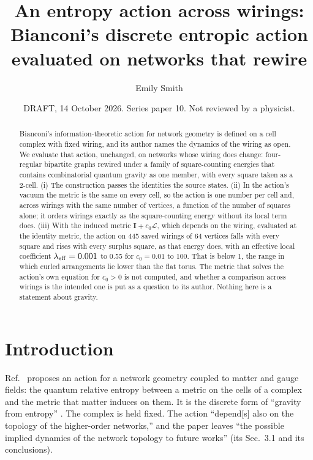\documentclass[pre,twocolumn,superscriptaddress,nofootinbib]{revtex4-2}
\begin{document}
\title{An entropy action across wirings: Bianconi's discrete entropic action evaluated on networks that rewire}

\author{Emily Smith}

\date{DRAFT, 14 October 2026. Series paper 10. Not reviewed by a physicist.}

\begin{abstract}
Bianconi's information-theoretic action for network geometry is defined on a cell complex with fixed wiring, and
its author names the dynamics of the wiring as open. We evaluate that action, unchanged, on networks whose wiring
does change: four-regular bipartite graphs rewired under a family of square-counting energies that contains
combinatorial quantum gravity as one member, with every square taken as a 2-cell. (i) The construction passes the
identities the source states. (ii) In the action's vacuum the metric is the same on every cell, so the action is one
number per cell and, across wirings with the same number of vertices, a function of the number of squares alone; it
orders wirings exactly as the square-counting energy without its local term does. (iii) With the induced metric
$\mathbf{I}+c_0\boldsymbol{\mathcal{L}}$, which depends on the wiring, evaluated at the identity metric, the action
on 445 saved wirings of 64 vertices falls with every square and rises with every surplus square, as that energy
does, with an effective local coefficient $\lambda_{\rm eff}=0.001$ to 0.55 for $c_0=0.01$ to 100. That is below 1,
the range in which curled arrangements lie lower than the flat torus. The metric that solves the action's own
equation for $c_0>0$ is not computed, and whether a comparison across wirings is the intended one is put as a
question to its author. Nothing here is a statement about gravity.
\end{abstract}

\maketitle

\section{Introduction}

Ref.~\cite{Bia24} proposes an action for a network geometry coupled to matter and gauge fields: the quantum
relative entropy between a metric on the cells of a complex and the metric that matter induces on them. It is the
discrete form of ``gravity from entropy'' \cite{Bia25}. The complex is held fixed. The action ``depend[s] also on the
topology of the higher-order networks,'' and the paper leaves ``the possible implied dynamics of the network topology
to future works'' (its Sec.~3.1 and its conclusions).
\end{document}
